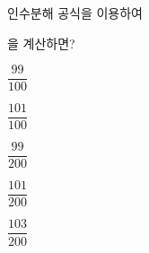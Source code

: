 인수분해 공식을 이용하여\par{}\noindent 을 계산하면?
\begin{choices32}{\rule[-3ex]{0pt}{8ex}$\dfrac{99}{100}$}{\rule[-3ex]{0pt}{8ex}$\dfrac{101}{100}$}{\rule[-3ex]{0pt}{8ex}$\dfrac{99}{200}$}{\rule[-3ex]{0pt}{8ex}$\dfrac{101}{200}$}{\rule[-3ex]{0pt}{8ex}$\dfrac{103}{200}$}\end{choices32}
